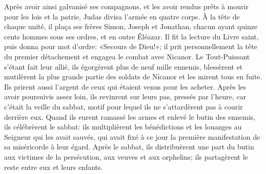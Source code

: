 Après avoir ainsi galvanisé ses compagnons,
	et les avoir rendus prêts à mourir pour les lois et la patrie,
	Judas divisa l’armée en quatre corps.
À la tête de chaque unité, il plaça ses frères Simon, Joseph et Jonathan,
	chacun ayant quinze cents hommes sous ses ordres,
	et en outre Éléazar.
Il fit la lecture du Livre saint, puis donna pour mot d’ordre:
		«Secours de Dieu!»;
	il prit personnellement la tête du premier détachement
	et engagea le combat avec Nicanor.
Le Tout-Puissant s’étant fait leur allié, ils égorgèrent plus de neuf mille ennemis,
	blessèrent et mutilèrent la plus grande partie des soldats de Nicanor
	et les mirent tous en fuite.
Ils prirent aussi l’argent de ceux qui étaient venus pour les acheter.
Après les avoir poursuivis assez loin, ils revinrent sur leurs pas, pressés par l’heure,
	car c’était la veille du sabbat,
		motif pour lequel ils ne s’attardèrent pas à courir derrière eux.
Quand ils eurent ramassé les armes et enlevé le butin des ennemis,
	ils célébrèrent le sabbat:
	ils multiplièrent les bénédictions et les louanges au Seigneur qui les avait sauvés,
	qui avait fixé à ce jour la première manifestation de sa miséricorde à leur égard.
Après le sabbat, ils distribuèrent une part du butin aux victimes de la persécution,
	aux veuves et aux orphelins;
	ils partagèrent le reste entre eux et leurs enfants.
